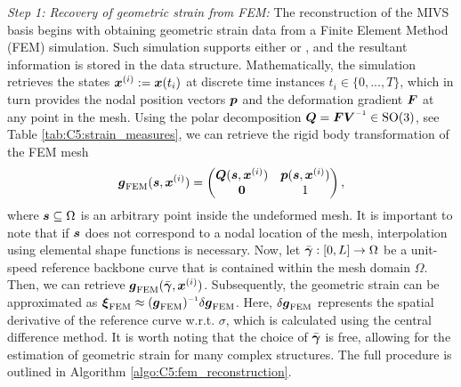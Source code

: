 \textit{Step 1: Recovery of geometric strain from FEM:} The reconstruction of the MIVS basis begins with obtaining geometric strain data from a Finite Element Method (FEM) simulation. Such simulation supports either  or , and the resultant information is stored in the  data structure. Mathematically, the simulation retrieves the states ${\boldsymbol{x}}^{(i)}:={\boldsymbol{x}}(t_i)$ at discrete time instances $t_i \in \{0,...,T\}$, which in turn provides the nodal position vectors ${\boldsymbol{p}}$ and the deformation gradient ${\boldsymbol{F}}$ at any point in the mesh. Using the polar decomposition $\QB = \FB\VB \inv \in \textrm{SO}(3)$, see Table \ref{tab:C5:strain_measures}, we can retrieve the rigid body transformation of the FEM mesh
%
\begin{equation}
{\boldsymbol{g}}_{\textrm{FEM}}({\boldsymbol{s}}, {\boldsymbol{x}}^{(i)}) = \begin{pmatrix} {\boldsymbol{Q}}({\boldsymbol{s}},{\boldsymbol{x}}^{(i)}) & {\boldsymbol{p}}({\boldsymbol{s}},{\boldsymbol{x}}^{(i)}) \\ \boldsymbol{0} & 1 \end{pmatrix},
\end{equation}
%
where ${\boldsymbol{s}} \subseteq \Omega$ is an arbitrary point inside the undeformed mesh. It is important to note that if ${\boldsymbol{s}}$ does not correspond to a nodal location of the mesh, interpolation using elemental shape functions is necessary. Now, let $\bar{{\boldsymbol{\gamma}}}: [0,L] \to \Omega$ be a unit-speed reference backbone curve that is contained within the mesh domain $\Omega$. Then, we can retrieve ${\boldsymbol{g}}_{\textrm{FEM}}(\bar{{\boldsymbol{\gamma}}},{\boldsymbol{x}}^{(i)})$. Subsequently, the geometric strain can be approximated as $\xiB_{\textrm{FEM}} \approx (\gB_{\textrm{FEM}})\inv \delta \gB_{\textrm{FEM}}$. Here, $\delta {\boldsymbol{g}}_{\textrm{FEM}}$ represents the spatial derivative of the reference curve w.r.t. $\sigma$, which is calculated using the central difference method. It is worth noting that the choice of $\bar{{\boldsymbol{\gamma}}}$ is free, allowing for the estimation of geometric strain for many complex structures. The full procedure is outlined in Algorithm \ref{algo:C5:fem_reconstruction}. \\
%
